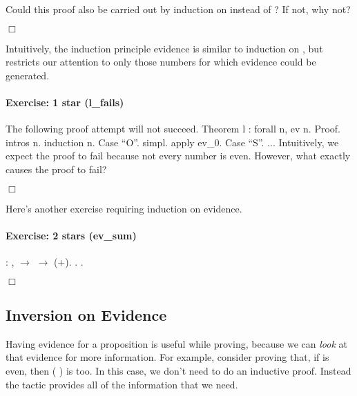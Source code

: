 \documentclass[12pt]{report}
\begin{document}
 Could this proof also be carried out by induction on  instead
    of ?  If not, why not? \begin{coqdoccode}
\coqdocemptyline
\end{coqdoccode}
\ensuremath{\Box} 

 Intuitively, the induction principle   evidence   is
    similar to induction on , but restricts our attention to only
    those numbers for which evidence   could be generated. 

\paragraph{Exercise: 1 star (l\_fails)}

 The following proof attempt will not succeed.
     Theorem l : forall n,
       ev n.
     Proof.
       intros n. induction n.
         Case ``O''. simpl. apply ev\_0.
         Case ``S''.
           ...
   Intuitively, we expect the proof to fail because not every
   number is even. However, what exactly causes the proof to fail?


 \ensuremath{\Box} 

 Here's another exercise requiring induction on evidence. \paragraph{Exercise: 2 stars (ev\_sum)}

\begin{coqdoccode}
\coqdocemptyline
\coqdocnoindent
{}  : \coqdockw{\ensuremath{\forall}}  ,\coqdoceol
\coqdocindent{1.50em}
  \ensuremath{\rightarrow}   \ensuremath{\rightarrow}  (+).\coqdoceol
\coqdocnoindent
{}.\coqdoceol
 .\coqdoceol
\end{coqdoccode}
\ensuremath{\Box} \begin{coqdoccode}
\coqdocemptyline
\end{coqdoccode}
\subsection{Inversion on Evidence}



 Having evidence for a proposition is useful while proving, because we 
   can \textit{look} at that evidence for more information. For example, consider 
    proving that, if  is even, then  ( ) is
    too.  In this case, we don't need to do an inductive proof.  Instead 
    the  tactic provides all of the information that we need.
\end{document}
